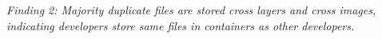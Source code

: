 \textit{Finding 2: Majority duplicate files are stored cross layers and cross images, indicating developers store same files in containers as other developers.}
%






